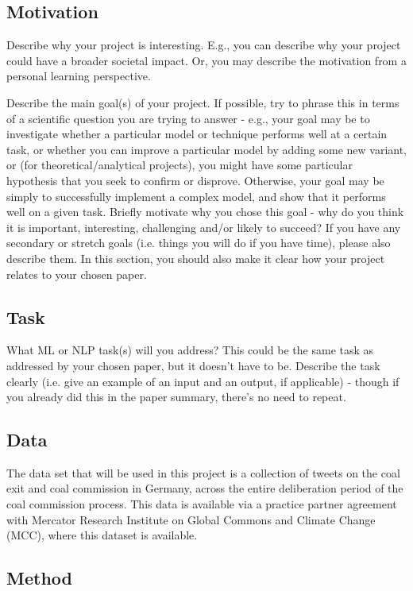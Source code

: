 \documentclass[10pt,twocolumn,letterpaper]{article}
\begin{document}
\subsection{Motivation}

Describe why your project is interesting. E.g., you can describe why your project could have a broader societal impact. Or, you may describe the motivation from a personal learning perspective.

Describe the main goal(s) of your project. If possible, try to phrase this in terms of a scientific question you are trying to answer - e.g., your goal may be to investigate whether a particular model or technique performs well at a certain task, or whether you can improve a particular model by adding some new variant, or (for theoretical/analytical projects), you might have some particular hypothesis that you seek to confirm or disprove. Otherwise, your goal may be simply to successfully implement a complex model, and show that it performs well on a given task. Briefly motivate why you chose this goal - why do you think it is important, interesting, challenging and/or likely to succeed? If you have any secondary or stretch goals (i.e. things you will do if you have time), please also describe them. In this section, you should also make it clear how your project relates to your chosen paper.


\subsection{Task}

What ML or NLP task(s) will you address? This could be the same task as addressed by your chosen paper, but it doesn't have to be. Describe the task clearly (i.e. give an example of an input and an output, if applicable) - though if you already did this in the paper summary, there's no need to repeat.

\subsection{Data}

The data set that will be used in this project is a collection of tweets on the coal exit and coal commission in Germany, across the entire deliberation period of the coal commission process. This data is available via a practice partner agreement with Mercator Research Institute on Global Commons and Climate Change (MCC), where this dataset is available. 

\subsection{Method}
\end{document}
